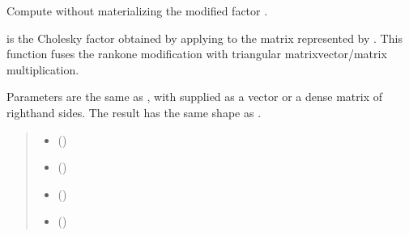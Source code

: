 \documentclass[a4paper,11pt,english]{sphinxmanual}
\begin{document}
\begin{fulllineitems}
\label{\detokenize{generated/cholrot.matvec:cholrot.matvec}}
\pysigstartsignatures
\pysiglinewithargsret
{}
{\sphinxparamcomma {}\sphinxparamcomma {}\sphinxparamcomma {}\sphinxparamcomma {}\sphinxparamcomma {}\sphinxparamcomma {}\sphinxparamcomma {}}
{}
\pysigstopsignatures
\sphinxAtStartPar
Compute  without materializing the modified factor .

\sphinxAtStartPar
{} is the Cholesky factor obtained by applying  to the
matrix represented by . This function fuses the rank\sphinxhyphen{}one modification
with triangular matrix\sphinxhyphen{}vector/matrix multiplication.

\sphinxAtStartPar
Parameters are the same as {\hyperref[\detokenize{generated/cholrot.update:cholrot.update}]{}}, with  supplied as a vector or
a dense matrix of right\sphinxhyphen{}hand sides. The result has the same shape as .
\begin{quote}\begin{description}
\begin{itemize}
\item {} 
\sphinxAtStartPar
{} ()

\item {} 
\sphinxAtStartPar
{} ()

\item {} 
\sphinxAtStartPar
{} ()

\item {} 
\sphinxAtStartPar
{} ()


\end{itemize}
\end{description}
\end{quote}
\end{fulllineitems}
\end{document}
